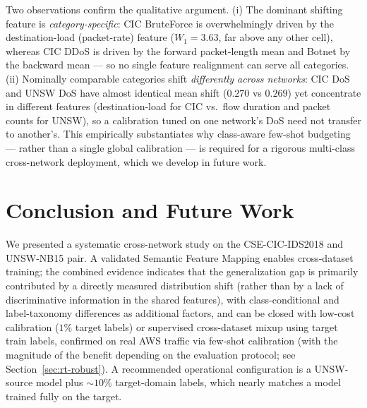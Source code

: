 \documentclass[preprint,12pt,authoryear]{elsarticle}
\begin{document}
Two observations confirm the qualitative argument. (i) The dominant shifting
feature is \emph{category-specific}: CIC BruteForce is overwhelmingly driven by
the destination-load (packet-rate) feature ($W_1\!=\!3.63$, far above any other
cell), whereas CIC DDoS is driven by the forward packet-length mean and Botnet by
the backward mean --- so no single feature realignment can serve all categories.
(ii) Nominally comparable categories shift \emph{differently across networks}:
CIC DoS and UNSW DoS have almost identical mean shift ($0.270$ vs $0.269$) yet
concentrate in different features (destination-load for CIC vs.\ flow duration and
packet counts for UNSW), so a calibration tuned on one network's DoS need not
transfer to another's. This empirically substantiates why class-aware few-shot
budgeting --- rather than a single global calibration --- is required for a
rigorous multi-class cross-network deployment, which we develop in future work.

\section{Conclusion and Future Work}
\label{sec:conclusion}

We presented a systematic cross-network study on the CSE-CIC-IDS2018 and UNSW-NB15
pair. A validated Semantic Feature Mapping enables cross-dataset training; the
combined evidence indicates that the generalization gap is primarily contributed by
a directly measured distribution shift (rather than by a lack of discriminative
information in the shared features), with class-conditional and label-taxonomy
differences as additional factors, and can be closed with low-cost calibration
($1\%$ target labels) or supervised cross-dataset mixup using target train labels,
confirmed on real AWS traffic via few-shot calibration (with the magnitude of the
benefit depending on the evaluation protocol; see Section~\ref{sec:rt-robust}). A
recommended operational configuration is a UNSW-source model plus $\sim$$10\%$
target-domain labels, which nearly matches a model trained fully on the target.
\end{document}
